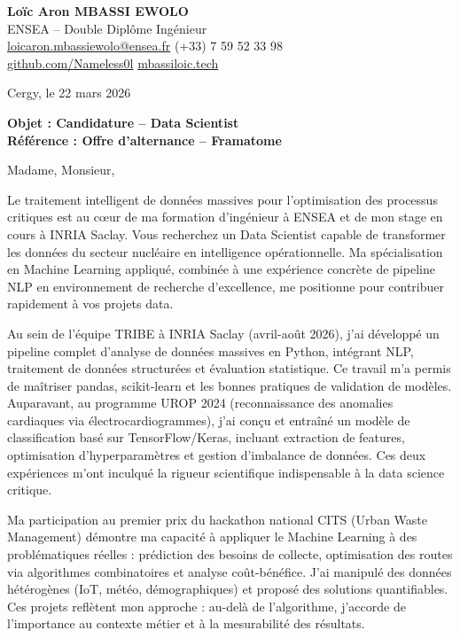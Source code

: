 \documentclass[a4paper,11pt]{article}
\begin{document}
\noindent
\textbf{Loïc Aron MBASSI EWOLO} \\
ENSEA -- Double Diplôme Ingénieur \\
\href{mailto:loicaron.mbassiewolo@ensea.fr}{loicaron.mbassiewolo@ensea.fr} \quad (+33) 7 59 52 33 98 \\
\href{https://github.com/Nameless0l}{github.com/Nameless0l} \quad \href{https://mbassiloic.tech}{mbassiloic.tech}

\vspace{1em}
\noindent Cergy, le 22 mars 2026

\vspace{1em}
\noindent
\textbf{Objet : Candidature -- Data Scientist} \\
\textbf{Référence : Offre d'alternance -- Framatome}

\vspace{1.5em}
\noindent Madame, Monsieur,

\vspace{0.8em}
Le traitement intelligent de données massives pour l'optimisation des processus critiques est au cœur de ma formation d'ingénieur à ENSEA et de mon stage en cours à INRIA Saclay. Vous recherchez un Data Scientist capable de transformer les données du secteur nucléaire en intelligence opérationnelle. Ma spécialisation en Machine Learning appliqué, combinée à une expérience concrète de pipeline NLP en environnement de recherche d'excellence, me positionne pour contribuer rapidement à vos projets data.

\vspace{0.8em}
Au sein de l'équipe TRIBE à INRIA Saclay (avril-août 2026), j'ai développé un pipeline complet d'analyse de données massives en Python, intégrant NLP, traitement de données structurées et évaluation statistique. Ce travail m'a permis de maîtriser pandas, scikit-learn et les bonnes pratiques de validation de modèles. Auparavant, au programme UROP 2024 (reconnaissance des anomalies cardiaques via électrocardiogrammes), j'ai conçu et entraîné un modèle de classification basé sur TensorFlow/Keras, incluant extraction de features, optimisation d'hyperparamètres et gestion d'imbalance de données. Ces deux expériences m'ont inculqué la rigueur scientifique indispensable à la data science critique.

\vspace{0.8em}
Ma participation au premier prix du hackathon national CITS (Urban Waste Management) démontre ma capacité à appliquer le Machine Learning à des problématiques réelles : prédiction des besoins de collecte, optimisation des routes via algorithmes combinatoires et analyse coût-bénéfice. J'ai manipulé des données hétérogènes (IoT, météo, démographiques) et proposé des solutions quantifiables. Ces projets reflètent mon approche : au-delà de l'algorithme, j'accorde de l'importance au contexte métier et à la mesurabilité des résultats.
\end{document}
